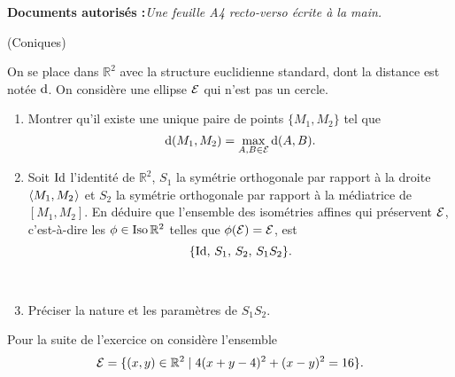 \documentclass[a4paper,12pt,reqno]{amsart}
\begin{document}
\ifsolutions\else
\textbf{Documents autorisés :}\textit{Une feuille A4 recto-verso écrite à la main.}
\tsvp
\vspace*{\fill}
\fi


\begin{exo} (Coniques)

  On se place dans $\mathbb{R}^{2}$ avec la structure euclidienne standard, dont la distance est notée $\operatorname{d}$. On considère une ellipse $\mathcal{E}$ qui n'est pas un cercle.

  \begin{enumerate}
    \item\label{M1M2} Montrer qu'il existe une unique paire de points $\{M_{1},M_{2}\}$ tel que
    \[
      \operatorname{d}(M_{1},M_{2})=\max_{A,B \in \mathcal{E}}\operatorname{d}(A,B).
    \]
    \item\label{S1S2}
    \begin{minipage}[t]{.7\linewidth}
      Soit $\mathrm{Id}$ l'identité de $\mathbb{R}^{2}$, $S_{1}$ la symétrie orthogonale par rapport à la droite $\langle{M_{1},M_{2}}\kern.07em\rangle$ et $S_{2}$ la symétrie orthogonale par rapport à la médiatrice de $[M_{1},M_{2}]$. En déduire que l'ensemble des isométries affines qui préservent $\mathcal{E}$, c'est-à-dire les $\phi \in \operatorname{Iso}{\mathbb{R}^{2}}$ telles que $\phi(\mathcal{E})=\mathcal{E}$, est
      \[
        \{\mathrm{Id},\, S_{1},\, S_{2},\, S_{1}S_{2}\}.
      \]
    \end{minipage}\hfill
    \begin{minipage}[t]{.28\linewidth}~\\
      \hspace*{\fill}
      \scalebox{.77}{}
    \end{minipage}
    \item Préciser la nature et les paramètres de $S_{1}S_{2}$.
  \end{enumerate}

  Pour la suite de l'exercice on considère l'ensemble
    \[
      \mathcal{E}=\{ (x,y) \in \mathbb{R}^{2} \mid 4(x+y-4)^{2}+(x-y)^{2}=16\}.
    \]


\end{exo}
\end{document}
